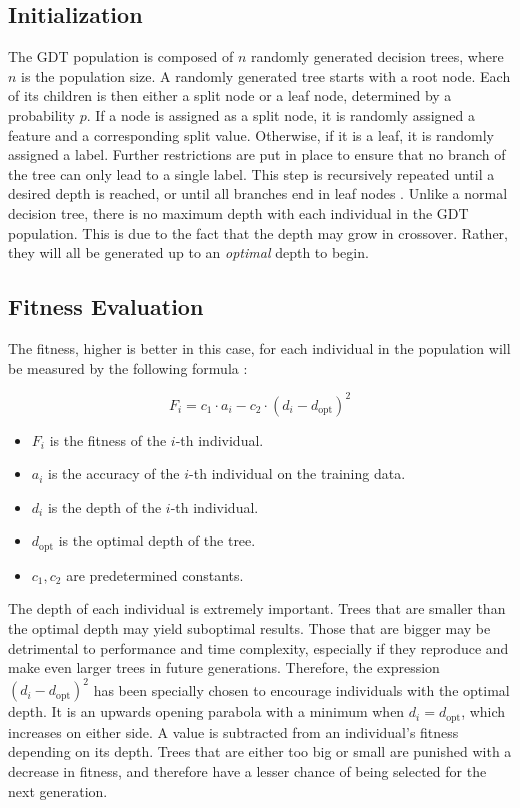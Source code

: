 \documentclass[12pt]{article}
\begin{document}
\subsection{Initialization}

The GDT population is composed of $n$ randomly generated decision trees, where $n$ is the population size. A randomly generated tree starts with a root node. Each of its children is then either a split node or a leaf node, determined by a probability $p$. If a node is assigned as a split node, it is randomly assigned a feature and a corresponding split value. Otherwise, if it is a leaf, it is randomly assigned a label. Further restrictions are put in place to ensure that no branch of the tree can only lead to a single label. This step is recursively repeated until a desired depth is reached, or until all branches end in leaf nodes \cite{faik_2020}. Unlike a normal decision tree, there is no maximum depth with each individual in the GDT population. This is due to the fact that the depth may grow in crossover. Rather, they will all be generated up to an \textit{optimal} depth to begin.

\subsection{Fitness Evaluation}

The fitness, higher is better in this case, for each individual in the population will be measured by the following formula \cite{faik_2020}:

\[ F_i = c_1 \cdot a_i - c_2 \cdot (d_i - d_\text{opt})^2 \]

\begin{itemize}
    \item $F_i$ is the fitness of the $i$-th individual.
    \item $a_i$ is the accuracy of the $i$-th individual on the training data.
    \item $d_i$ is the depth of the $i$-th individual.
    \item $d_\text{opt}$ is the optimal depth of the tree.
    \item $c_1, c_2$ are predetermined constants.
\end{itemize}

The depth of each individual is extremely important. Trees that are smaller than the optimal depth may yield suboptimal results. Those that are bigger may be detrimental to performance and time complexity, especially if they reproduce and make even larger trees in future generations. Therefore, the expression $(d_i - d_\text{opt})^2$ has been specially chosen to encourage individuals with the optimal depth. It is an upwards opening parabola with a minimum when $d_i = d_\text{opt}$, which increases on either side. A value is subtracted from an individual's fitness depending on its depth. Trees that are either too big or small are punished with a decrease in fitness, and therefore have a lesser chance of being selected for the next generation.
\end{document}
